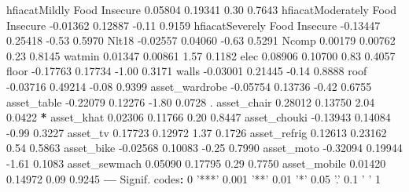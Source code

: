 \documentclass[12pt, krantz2,]{krantz}
\newenvironment{Shaded}{\begin{snugshade}}{\end{snugshade}}
\newcommand{\DecValTok}[1]{\textcolor[rgb]{0.06,0.06,0.06}{#1}}
\newcommand{\FloatTok}[1]{\textcolor[rgb]{0.06,0.06,0.06}{#1}}
\newcommand{\NormalTok}[1]{#1}
\newcommand{\OperatorTok}[1]{\textcolor[rgb]{0.43,0.43,0.43}{\textbf{#1}}}
\newcommand{\StringTok}[1]{\textcolor[rgb]{0.5,0.5,0.5}{#1}}
\theoremstyle{definition}
\theoremstyle{definition}
\theoremstyle{definition}
\newcommand{\1}{\mathbbm{1}}
\begin{document}
\begin{Shaded}
\begin{Highlighting}[]
\NormalTok{hfiacatMildly Food Insecure      }\FloatTok{0.05804}    \FloatTok{0.19341}    \FloatTok{0.30}   \FloatTok{0.7643}   
\NormalTok{hfiacatModerately Food Insecure }\FloatTok{-0.01362}    \FloatTok{0.12887}   \FloatTok{-0.11}   \FloatTok{0.9159}   
\NormalTok{hfiacatSeverely Food Insecure   }\FloatTok{-0.13447}    \FloatTok{0.25418}   \FloatTok{-0.53}   \FloatTok{0.5970}   
\NormalTok{Nlt18                           }\FloatTok{-0.02557}    \FloatTok{0.04060}   \FloatTok{-0.63}   \FloatTok{0.5291}   
\NormalTok{Ncomp                            }\FloatTok{0.00179}    \FloatTok{0.00762}    \FloatTok{0.23}   \FloatTok{0.8145}   
\NormalTok{watmin                           }\FloatTok{0.01347}    \FloatTok{0.00861}    \FloatTok{1.57}   \FloatTok{0.1182}   
\NormalTok{elec                             }\FloatTok{0.08906}    \FloatTok{0.10700}    \FloatTok{0.83}   \FloatTok{0.4057}   
\NormalTok{floor                           }\FloatTok{-0.17763}    \FloatTok{0.17734}   \FloatTok{-1.00}   \FloatTok{0.3171}   
\NormalTok{walls                           }\FloatTok{-0.03001}    \FloatTok{0.21445}   \FloatTok{-0.14}   \FloatTok{0.8888}   
\NormalTok{roof                            }\FloatTok{-0.03716}    \FloatTok{0.49214}   \FloatTok{-0.08}   \FloatTok{0.9399}   
\NormalTok{asset_wardrobe                  }\FloatTok{-0.05754}    \FloatTok{0.13736}   \FloatTok{-0.42}   \FloatTok{0.6755}   
\NormalTok{asset_table                     }\FloatTok{-0.22079}    \FloatTok{0.12276}   \FloatTok{-1.80}   \FloatTok{0.0728}\NormalTok{ . }
\NormalTok{asset_chair                      }\FloatTok{0.28012}    \FloatTok{0.13750}    \FloatTok{2.04}   \FloatTok{0.0422} \OperatorTok{*}\StringTok{ }
\NormalTok{asset_khat                       }\FloatTok{0.02306}    \FloatTok{0.11766}    \FloatTok{0.20}   \FloatTok{0.8447}   
\NormalTok{asset_chouki                    }\FloatTok{-0.13943}    \FloatTok{0.14084}   \FloatTok{-0.99}   \FloatTok{0.3227}   
\NormalTok{asset_tv                         }\FloatTok{0.17723}    \FloatTok{0.12972}    \FloatTok{1.37}   \FloatTok{0.1726}   
\NormalTok{asset_refrig                     }\FloatTok{0.12613}    \FloatTok{0.23162}    \FloatTok{0.54}   \FloatTok{0.5863}   
\NormalTok{asset_bike                      }\FloatTok{-0.02568}    \FloatTok{0.10083}   \FloatTok{-0.25}   \FloatTok{0.7990}   
\NormalTok{asset_moto                      }\FloatTok{-0.32094}    \FloatTok{0.19944}   \FloatTok{-1.61}   \FloatTok{0.1083}   
\NormalTok{asset_sewmach                    }\FloatTok{0.05090}    \FloatTok{0.17795}    \FloatTok{0.29}   \FloatTok{0.7750}   
\NormalTok{asset_mobile                     }\FloatTok{0.01420}    \FloatTok{0.14972}    \FloatTok{0.09}   \FloatTok{0.9245}   
\OperatorTok{---}
\NormalTok{Signif. codes}\OperatorTok{:}\StringTok{  }\DecValTok{0} \StringTok{'***'} \FloatTok{0.001} \StringTok{'**'} \FloatTok{0.01} \StringTok{'*'} \FloatTok{0.05} \StringTok{'.'} \FloatTok{0.1} \StringTok{' '} \DecValTok{1}


\end{Highlighting}
\end{Shaded}
\end{document}

